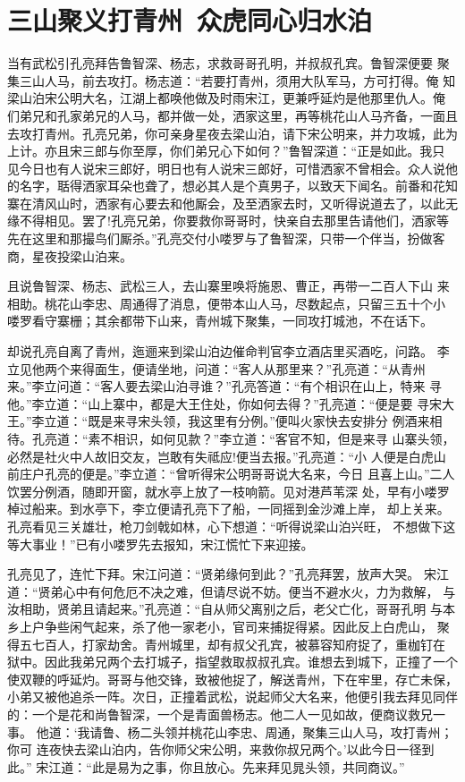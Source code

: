 \chapter{三山聚义打青州~众虎同心归水泊}

当有武松引孔亮拜告鲁智深、杨志，求救哥哥孔明，并叔叔孔宾。鲁智深便要
聚集三山人马，前去攻打。杨志道：“若要打青州，须用大队军马，方可打得。俺
知梁山泊宋公明大名，江湖上都唤他做及时雨宋江，更兼呼延灼是他那里仇人。俺
们弟兄和孔家弟兄的人马，都并做一处，洒家这里，再等桃花山人马齐备，一面且
去攻打青州。孔亮兄弟，你可亲身星夜去梁山泊，请下宋公明来，并力攻城，此为
上计。亦且宋三郎与你至厚，你们弟兄心下如何？”鲁智深道：“正是如此。我只
见今日也有人说宋三郎好，明日也有人说宋三郎好，可惜洒家不曾相会。众人说他
的名字，聒得洒家耳朵也聋了，想必其人是个真男子，以致天下闻名。前番和花知
寨在清风山时，洒家有心要去和他厮会，及至洒家去时，又听得说道去了，以此无
缘不得相见。罢了!孔亮兄弟，你要救你哥哥时，快亲自去那里告请他们，洒家等
先在这里和那撮鸟们厮杀。”孔亮交付小喽罗与了鲁智深，只带一个伴当，扮做客
商，星夜投梁山泊来。

且说鲁智深、杨志、武松三人，去山寨里唤将施恩、曹正，再带一二百人下山
来相助。桃花山李忠、周通得了消息，便带本山人马，尽数起点，只留三五十个小
喽罗看守寨栅；其余都带下山来，青州城下聚集，一同攻打城池，不在话下。

却说孔亮自离了青州，迤逦来到梁山泊边催命判官李立酒店里买酒吃，问路。
李立见他两个来得面生，便请坐地，问道：“客人从那里来？”孔亮道：“从青州
来。”李立问道：“客人要去梁山泊寻谁？”孔亮答道：“有个相识在山上，特来
寻他。”李立道：“山上寨中，都是大王住处，你如何去得？”孔亮道：“便是要
寻宋大王。”李立道：“既是来寻宋头领，我这里有分例。”便叫火家快去安排分
例酒来相待。孔亮道：“素不相识，如何见款？”李立道：“客官不知，但是来寻
山寨头领，必然是社火中人故旧交友，岂敢有失祗应!便当去报。”孔亮道：“小
人便是白虎山前庄户孔亮的便是。”李立道：“曾听得宋公明哥哥说大名来，今日
且喜上山。”二人饮罢分例酒，随即开窗，就水亭上放了一枝响箭。见对港芦苇深
处，早有小喽罗棹过船来。到水亭下，李立便请孔亮下了船，一同摇到金沙滩上岸，
却上关来。孔亮看见三关雄壮，枪刀剑戟如林，心下想道：“听得说梁山泊兴旺，
不想做下这等大事业！”已有小喽罗先去报知，宋江慌忙下来迎接。

孔亮见了，连忙下拜。宋江问道：“贤弟缘何到此？”孔亮拜罢，放声大哭。
宋江道：“贤弟心中有何危厄不决之难，但请尽说不妨。便当不避水火，力为救解，
与汝相助，贤弟且请起来。”孔亮道：“自从师父离别之后，老父亡化，哥哥孔明
与本乡上户争些闲气起来，杀了他一家老小，官司来捕捉得紧。因此反上白虎山，
聚得五七百人，打家劫舍。青州城里，却有叔父孔宾，被慕容知府捉了，重枷钉在
狱中。因此我弟兄两个去打城子，指望救取叔叔孔宾。谁想去到城下，正撞了一个
使双鞭的呼延灼。哥哥与他交锋，致被他捉了，解送青州，下在牢里，存亡未保，
小弟又被他追杀一阵。次日，正撞着武松，说起师父大名来，他便引我去拜见同伴
的：一个是花和尚鲁智深，一个是青面兽杨志。他二人一见如故，便商议救兄一事。
他道：‘我请鲁、杨二头领并桃花山李忠、周通，聚集三山人马，攻打青州；你可
连夜快去梁山泊内，告你师父宋公明，来救你叔兄两个。’以此今日一径到此。”
宋江道：“此是易为之事，你且放心。先来拜见晁头领，共同商议。”

